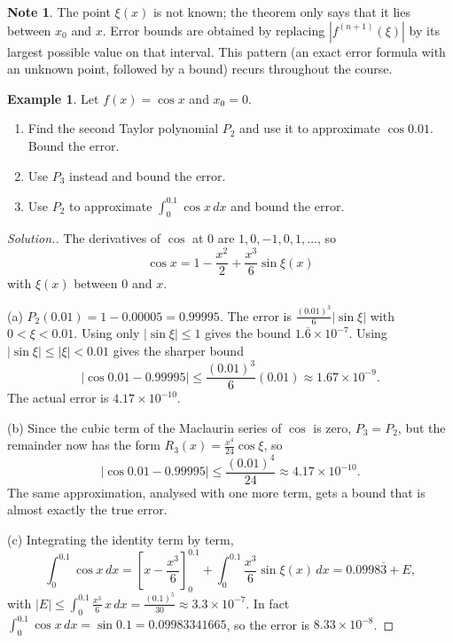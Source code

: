 \documentclass[11pt,a4paper]{article}
\numberwithin{equation}{section}
\theoremstyle{definition}
\newtheorem{exa}[thm]{Example}
\newtheorem*{note}{Note}
\newenvironment{solution}
  {\renewcommand{\qedsymbol}{}\begin{proof}[\textit{Solution}.]}
  {\end{proof}}
\begin{document}
\begin{note}
The point $\xi(x)$ is not known; the theorem only says that it lies between $x_0$ and $x$. Error bounds are obtained by replacing
$|f^{(n+1)}(\xi)|$ by its largest possible value on that interval. This pattern (an exact error formula with an unknown point, followed by
a bound) recurs throughout the course.
\end{note}

\begin{exa}
\label{exa:cos}
Let $f(x) = \cos x$ and $x_0 = 0$.
\begin{enumerate}
\item[(a)] Find the second Taylor polynomial $P_2$ and use it to approximate $\cos 0.01$. Bound the error.
\item[(b)] Use $P_3$ instead and bound the error.
\item[(c)] Use $P_2$ to approximate $\int_0^{0.1}\cos x\,dx$ and bound the error.
\end{enumerate}
\end{exa}

\begin{solution}
The derivatives of $\cos$ at $0$ are $1, 0, -1, 0, 1,\dots$, so
$$\cos x = 1 - \frac{x^2}{2} + \frac{x^3}{6}\sin\xi(x)$$
with $\xi(x)$ between $0$ and $x$.

(a) $P_2(0.01) = 1 - 0.00005 = 0.99995$. The error is $\frac{(0.01)^3}{6}|\sin\xi|$ with $0<\xi<0.01$. Using only $|\sin\xi|\leq 1$
gives the bound $1.\overline{6}\times10^{-7}$. Using $|\sin\xi|\leq|\xi|<0.01$ gives the sharper bound
$$|\cos 0.01 - 0.99995|\leq\frac{(0.01)^3}{6}(0.01)\approx 1.67\times10^{-9}.$$
The actual error is $4.17\times10^{-10}$.

(b) Since the cubic term of the Maclaurin series of $\cos$ is zero, $P_3 = P_2$, but the remainder now has the form
$R_3(x) = \frac{x^4}{24}\cos\xi$, so
$$|\cos0.01 - 0.99995|\leq\frac{(0.01)^4}{24}\approx 4.17\times10^{-10}.$$
The same approximation, analysed with one more term, gets a bound that is almost exactly the true error.

(c) Integrating the identity term by term,
$$\int_0^{0.1}\cos x\,dx = \left[x - \frac{x^3}{6}\right]_0^{0.1} + \int_0^{0.1}\frac{x^3}{6}\sin\xi(x)\,dx = 0.0998\overline{3} + E,$$
with $|E|\leq\int_0^{0.1}\frac{x^3}{6}\,x\,dx = \frac{(0.1)^5}{30}\approx 3.3\times10^{-7}$. In fact $\int_0^{0.1}\cos x\,dx = \sin0.1 =
0.09983341665$, so the error is $8.33\times10^{-8}$.
\end{solution}
\end{document}
